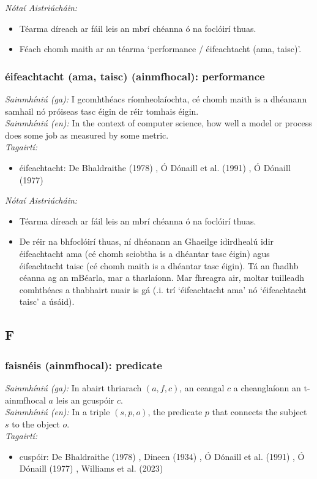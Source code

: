 \documentclass{article}
\begin{document}
 \noindent \textit{Nótaí Aistriúcháin:}
\begin{itemize}
	\item Téarma díreach ar fáil leis an mbrí chéanna ó na foclóirí thuas.
	\item Féach chomh maith ar an téarma `performance / éifeachtacht (ama, taisc)'.
\end{itemize}


\subsubsection*{éifeachtacht (ama, taisc) (ainmfhocal): performance}
 \noindent \textit{Sainmhíniú (ga):} I gcomhthéacs ríomheolaíochta, cé chomh maith is a dhéanann samhail nó próiseas tasc éigin de réir tomhais éigin.
\\
 \noindent \textit{Sainmhíniú (en):} In the context of computer science, how well a model or process does some job as measured by some metric.
\\
 \noindent \textit{Tagairtí:}
\begin{itemize}
	\item éifeachtacht: De Bhaldraithe (1978) \cite{de-bhaldraithe}, Ó Dónaill et al. (1991) \cite{focloir-beag}, Ó Dónaill (1977) \cite{odonaill}
\end{itemize}

 \noindent \textit{Nótaí Aistriúcháin:}
\begin{itemize}
	\item Téarma díreach ar fáil leis an mbrí chéanna ó na foclóirí thuas.
	\item De réir na bhfoclóirí thuas, ní dhéanann an Ghaeilge idirdhealú idir éifeachtacht ama (cé chomh sciobtha is a dhéantar tasc éigin) agus éifeachtacht taisc (cé chomh maith is a dhéantar tasc éigin). Tá an fhadhb céanna ag an mBéarla, mar a tharlaíonn. Mar fhreagra air, moltar tuilleadh comhthéacs a thabhairt nuair is gá (.i. trí `éifeachtacht ama' nó `éifeachtacht taisc' a úsáid).
\end{itemize}


\subsection*{F}

\subsubsection*{faisnéis (ainmfhocal): predicate}
 \noindent \textit{Sainmhíniú (ga):} In abairt thriarach $(a,f,c)$, an ceangal $c$ a cheanglaíonn an t-ainmfhocal $a$ leis an gcuspóir $c$.
\\
 \noindent \textit{Sainmhíniú (en):} In a triple $(s,p,o)$, the predicate $p$ that connects the subject $s$ to the object $o$.
\\
 \noindent \textit{Tagairtí:}
\begin{itemize}
	\item cuspóir: De Bhaldraithe (1978) \cite{de-bhaldraithe}, Dineen (1934) \cite{dineen}, Ó Dónaill et al. (1991) \cite{focloir-beag}, Ó Dónaill (1977) \cite{odonaill}, Williams et al. (2023) \cite{storchiste}
\end{itemize}
\end{document}
